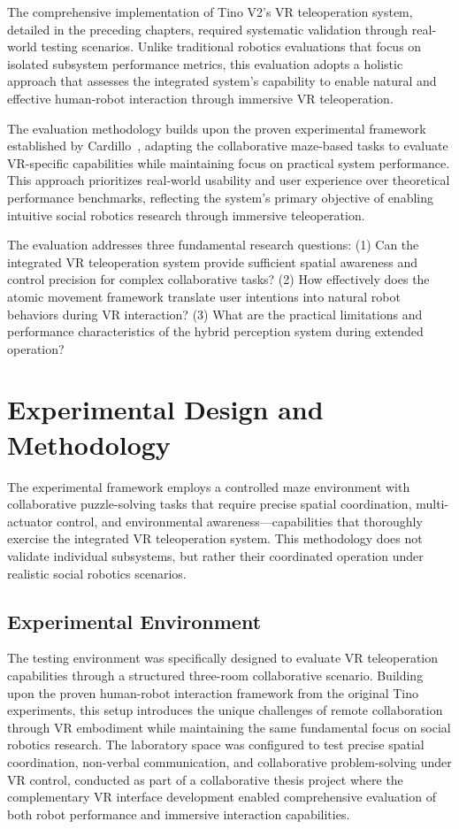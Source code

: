 \label{ch:evaluation}

The comprehensive implementation of Tino V2's VR teleoperation system, detailed in the preceding chapters, required systematic validation through real-world testing scenarios. Unlike traditional robotics evaluations that focus on isolated subsystem performance metrics, this evaluation adopts a holistic approach that assesses the integrated system's capability to enable natural and effective human-robot interaction through immersive VR teleoperation.

The evaluation methodology builds upon the proven experimental framework established by Cardillo~\cite{cardillo2024thesis}, adapting the collaborative maze-based tasks to evaluate VR-specific capabilities while maintaining focus on practical system performance. This approach prioritizes real-world usability and user experience over theoretical performance benchmarks, reflecting the system's primary objective of enabling intuitive social robotics research through immersive teleoperation.

The evaluation addresses three fundamental research questions: (1) Can the integrated VR teleoperation system provide sufficient spatial awareness and control precision for complex collaborative tasks? (2) How effectively does the atomic movement framework translate user intentions into natural robot behaviors during VR interaction? (3) What are the practical limitations and performance characteristics of the hybrid perception system during extended operation?

\section{Experimental Design and Methodology}
\label{sec:experimental_design}

The experimental framework employs a controlled maze environment with collaborative puzzle-solving tasks that require precise spatial coordination, multi-actuator control, and environmental awareness—capabilities that thoroughly exercise the integrated VR teleoperation system. This methodology does not validate individual subsystems, but rather their coordinated operation under realistic social robotics scenarios.

\subsection{Experimental Environment}

The testing environment was specifically designed to evaluate VR teleoperation capabilities through a structured three-room collaborative scenario. Building upon the proven human-robot interaction framework from the original Tino experiments, this setup introduces the unique challenges of remote collaboration through VR embodiment while maintaining the same fundamental focus on social robotics research. The laboratory space was configured to test precise spatial coordination, non-verbal communication, and collaborative problem-solving under VR control, conducted as part of a collaborative thesis project where the complementary VR interface development enabled comprehensive evaluation of both robot performance and immersive interaction capabilities.

